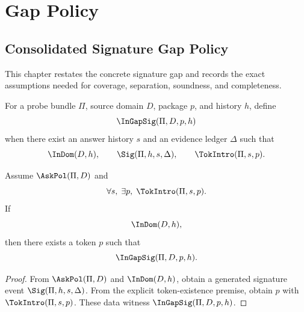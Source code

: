 \chapter{Gap Policy}
\label{ch:proof-obligations-gap-policy}

\section{Consolidated Signature Gap Policy}
\label{sec:po-gap-policy-abstract}

This chapter restates the concrete signature gap and records the exact assumptions needed for coverage, separation, soundness, and completeness.

\begin{definition}
\label{def:policy-supported-signature-gap}
For a probe bundle $\Pi$, source domain $D$, package $p$, and history $h$, define
$$
  \InGapSig(\Pi,D,p,h)
$$
when there exist an answer history \(s\) and an evidence ledger \(\Delta\) such that
$$
  \InDom(D,h),
  \qquad
  \Sig(\Pi,h,s,\Delta),
  \qquad
  \TokIntro(\Pi,s,p).
$$
\end{definition}

\begin{theorem}
\label{thm:gap-coverage-policy}
Assume $\AskPol(\Pi,D)$ and
$$
  \forall s,\;\exists p,\;\TokIntro(\Pi,s,p).
$$
If
$$
  \InDom(D,h),
$$
then there exists a token \(p\) such that
$$
  \InGapSig(\Pi,D,p,h).
$$
\end{theorem}

\begin{proof}
From $\AskPol(\Pi,D)$ and $\InDom(D,h)$, obtain a generated signature event $\Sig(\Pi,h,s,\Delta)$. From the explicit token-existence premise, obtain $p$ with $\TokIntro(\Pi,s,p)$. These data witness $\InGapSig(\Pi,D,p,h)$.
\end{proof}

